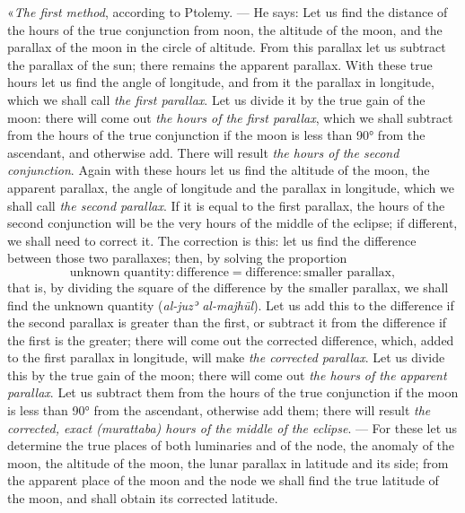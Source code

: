 \documentclass[11pt]{article}
\newcommand{\Pg}[1]{\marginpar{\footnotesize\color{gray}#1}}
\begin{document}
\par \Pg{I 280}«\emph{The first method}, according to Ptolemy. — He says: Let us find the distance of the hours of the true conjunction from noon, the altitude of the moon, and the parallax of the moon in the circle of altitude. From this parallax let us subtract the parallax of the sun; there remains the apparent parallax. With these true hours let us find the angle of longitude, and from it the parallax in longitude, which we shall call \emph{the first parallax}. Let us divide it by the true gain of the moon: there will come out \emph{the hours of the first parallax}, which we shall subtract from the hours of the true conjunction if the moon is less than 90° from the ascendant, and otherwise add. There will result \emph{the hours of the second conjunction}. Again with these hours let us find the altitude of the moon, the apparent parallax, the angle of longitude and the parallax in longitude, which we shall call \emph{the second parallax}. If it is equal to the first parallax, the hours of the second conjunction will be the very hours of the middle of the eclipse; if different, we shall need to correct it. The correction is this: let us find the difference between those two parallaxes; then, by solving the proportion \[ \text{unknown quantity} : \text{difference} = \text{difference} : \text{smaller parallax}, \] that is, by dividing the square of the difference by the smaller parallax, we shall find the unknown quantity (\emph{al-juzʾ al-majhūl}). Let us add this to the difference if the second parallax is greater than the first, or subtract it from the difference if the first is the greater; there will come out the corrected difference, which, added to the first parallax in longitude, will make \emph{the corrected parallax}. Let us divide this by the true gain of the moon; there will come out \emph{the hours of the apparent parallax}. Let us subtract them from the hours of the true conjunction if the moon is less than 90° from the ascendant, otherwise add them; there will result \emph{the corrected, exact (murattaba) hours of the middle of the eclipse}. — For these let us determine the true places of both luminaries and of the node, the anomaly of the moon, the altitude of the moon, the lunar parallax in latitude and its side; from the apparent place of the moon and the node we shall find the true latitude of the moon, and shall obtain its corrected latitude.\par
\end{document}
